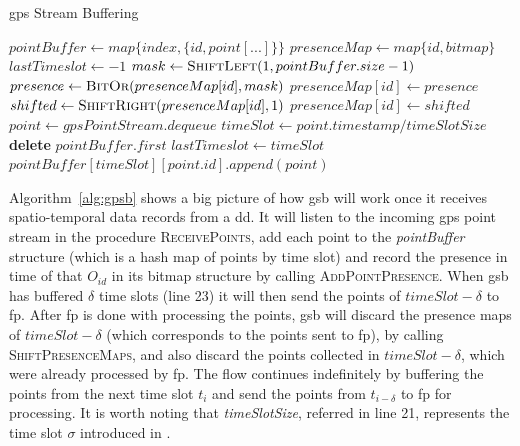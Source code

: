 \begin{algorithm}[h!]
\caption{\ac{gps} Stream Buffering}
\label{alg:gpsb}
\begin{algorithmic}[1]
    \State $pointBuffer \gets map\{index, \{id, point[...]\}\}$
    \State $presenceMap \gets map\{id, bitmap\}$
    \State $lastTimeslot \gets -1$
    \State
        \State $mask \gets \Call{ShiftLeft}{1, pointBuffer.size - 1}$
        \State $presence \gets \Call{BitOr}{presenceMap[id], mask}$
        \State $presenceMap[id] \gets presence$
    \EndProcedure
    \State
            \State $shifted \gets \Call{ShiftRight}{presenceMap[id], 1}$
            \State $presenceMap[id] \gets shifted$
        \EndFor
    \EndProcedure
    \State
        \Loop
            \State $point \gets gpsPointStream.dequeue$
            \State $timeSlot \gets point.timestamp / timeSlotSize$
                    \State {}
                    \State \textbf{delete} $pointBuffer.first$
                    \State {}
                \EndIf
                \State $lastTimeslot \gets timeSlot$
            \EndIf
            \State $pointBuffer[timeSlot][point.id].append(point)$
            \State {}
        \EndLoop
    \EndProcedure
\end{algorithmic}
\end{algorithm}

Algorithm~\ref{alg:gpsb} shows a big picture of how \ac{gsb} will work once it receives spatio-temporal data records
from a \ac{dd}. It will listen to the incoming \ac{gps} point stream in the procedure \textsc{ReceivePoints}, add each
point to the \textit{pointBuffer} structure (which is a hash map of points by time slot) and record the presence in time
of that $O_{id}$ in its bitmap structure by calling \textsc{AddPointPresence}. When \ac{gsb} has buffered $\delta$ time
slots (line 23) it will then send the points of $timeSlot - \delta$ to \ac{fp}. After \ac{fp} is done with processing
the points, \ac{gsb} will discard the presence maps of $timeSlot - \delta$ (which corresponds to the points sent to
\ac{fp}), by calling \textsc{ShiftPresenceMaps}, and also discard the points collected in $timeSlot - \delta$, which
were already processed by \ac{fp}. The flow continues indefinitely by buffering the points from the next time slot $t_i$
and send the points from $t_{i - \delta}$ to \ac{fp} for processing. It is worth noting that \textit{timeSlotSize},
referred in line 21, represents the time slot $\sigma$ introduced in .

